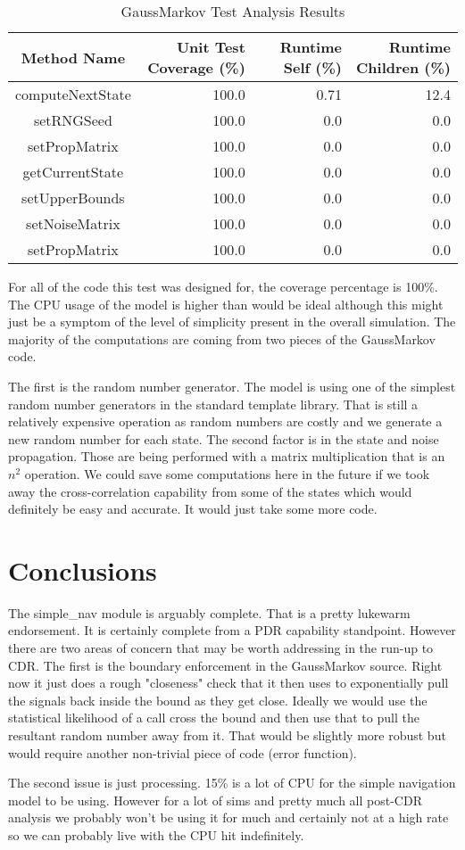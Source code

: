 \documentclass[]{BasiliskReportMemo}
\begin{document}
\begin{table}[htbp]
    \caption{GaussMarkov Test Analysis Results}
   \label{tab:cov_met2}
        \centering \fontsize{10}{10}\selectfont
   \begin{tabular}{c | r | r | r} %
      \hline
      Method Name    & Unit Test Coverage (\%) & Runtime Self (\%) & Runtime Children (\%) \\
      \hline
      computeNextState & 100.0 & 0.71 & 12.4 \\
      setRNGSeed & 100.0 & 0.0 & 0.0 \\
      setPropMatrix & 100.0 & 0.0 & 0.0 \\
      getCurrentState & 100.0 & 0.0 & 0.0 \\
      setUpperBounds & 100.0 & 0.0 & 0.0 \\
      setNoiseMatrix & 100.0 & 0.0 & 0.0 \\
      setPropMatrix & 100.0 & 0.0 & 0.0 \\
      \hline
   \end{tabular}
\end{table}
For all of the code this test was designed for, the coverage percentage is 
100\%.  The CPU usage of the model is higher than would be ideal although this 
might just be a symptom of the level of simplicity present in the overall 
simulation.  The majority of the computations are coming from two pieces of the 
GaussMarkov code.  

The first is the random number generator.  The model is using 
one of the simplest random number generators in the standard template library.  
That is still a relatively expensive operation as random numbers are costly and 
we generate a new random number for each state.  The second factor is in the 
state and noise propagation.  Those are being performed with a matrix 
multiplication that is an $n^2$ operation.  We could save some computations 
here in the future if we took away the cross-correlation capability from some 
of the states which would definitely be easy and accurate.  It would just take 
some more code.

\section{Conclusions}
The simple\_nav module is arguably complete.  That is a pretty lukewarm 
endorsement.  It is certainly complete from a PDR capability standpoint.  
However there are two areas of concern that may be worth addressing in the 
run-up to CDR.  The first is the boundary enforcement in the GaussMarkov 
source.  Right now it just does a rough "closeness" check that it then uses 
to exponentially pull the signals back inside the bound as they get close.  
Ideally we would use the statistical likelihood of a call cross the bound and 
then use that to pull the resultant random number away from it.  That would be 
slightly more robust but would require another non-trivial piece of code 
(error function).

The second issue is just processing.  15\% is a lot of CPU for the simple 
navigation model to be using.  However for a lot of sims and pretty much all 
post-CDR analysis we probably won't be using it for much and certainly not at 
a high rate so we can probably live with the CPU hit indefinitely.
\end{document}
